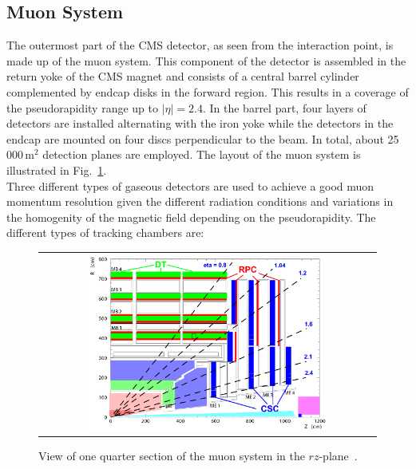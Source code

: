 \subsection{Muon System}
\label{subsec:cms_muon}
The outermost part of the CMS detector, as seen from the interaction point, is made up of the muon system. This component of the detector is assembled in the return yoke of the CMS magnet and consists of a central barrel cylinder complemented by endcap disks in the forward region. This results in a coverage of the pseudorapidity range up to $|\eta| = 2.4$. In the barrel part, four layers of detectors are installed alternating with the iron yoke while the detectors in the endcap are mounted on four discs perpendicular to the beam. In total, about 25\,000\,$\mathrm{m}^2$ detection planes are employed. The layout of the muon system is illustrated in Fig.~\ref{fig:CMS_muon}. \\
Three different types of gaseous detectors are used to achieve a good muon momentum resolution given the different radiation conditions and variations in the homogenity of the magnetic field depending on the pseudorapidity. The different types of tracking chambers are:
\begin{figure}[!tp]
  \centering
  \begin{tabular}{c}
    \includegraphics[width=0.725\textwidth]{figures/Figures_Experimental_Apparatus_MuonDetector.png}
  \end{tabular}
  \caption{View of one quarter section of the muon system in the $rz$-plane~\cite{bib:cmsptdr1}.}
  \label{fig:CMS_muon}
\end{figure}

